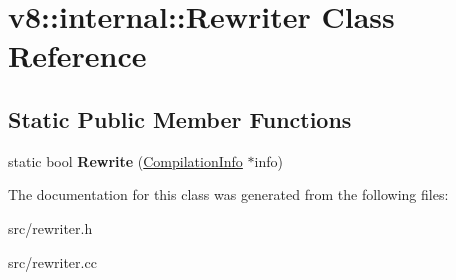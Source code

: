 \hypertarget{classv8_1_1internal_1_1_rewriter}{}\section{v8\+:\+:internal\+:\+:Rewriter Class Reference}
\label{classv8_1_1internal_1_1_rewriter}
\subsection*{Static Public Member Functions}
\begin{DoxyCompactItemize}
\item 
\hypertarget{classv8_1_1internal_1_1_rewriter_aaee880c6719cac65c6753889c578c8d8}{}static bool {\bfseries Rewrite} (\hyperlink{classv8_1_1internal_1_1_compilation_info}{Compilation\+Info} $\ast$info)\label{classv8_1_1internal_1_1_rewriter_aaee880c6719cac65c6753889c578c8d8}

\end{DoxyCompactItemize}


The documentation for this class was generated from the following files\+:\begin{DoxyCompactItemize}
\item 
src/rewriter.\+h\item 
src/rewriter.\+cc\end{DoxyCompactItemize}
